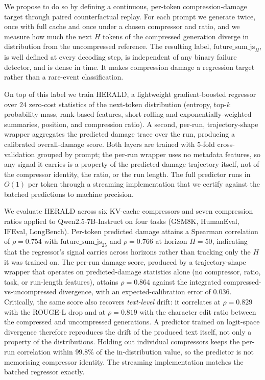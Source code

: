 \documentclass[11pt,a4paper]{article}
\begin{document}
We propose to do so by defining a continuous, per-token compression-damage target through paired counterfactual replay. For each prompt we generate twice, once with full cache and once under a chosen compressor and ratio, and we measure how much the next $H$ tokens of the compressed generation diverge in distribution from the uncompressed reference. The resulting label, $\text{future\_sum\_js}_H$, is well defined at every decoding step, is independent of any binary failure detector, and is dense in time. It makes compression damage a regression target rather than a rare-event classification.

On top of this label we train HERALD, a lightweight gradient-boosted regressor over $24$ zero-cost statistics of the next-token distribution (entropy, top-$k$ probability mass, rank-based features, short rolling and exponentially-weighted summaries, position, and compression ratio). A second, per-run, trajectory-shape wrapper aggregates the predicted damage trace over the run, producing a calibrated overall-damage score. Both layers are trained with $5$-fold cross-validation grouped by prompt; the per-run wrapper uses no metadata features, so any signal it carries is a property of the predicted-damage trajectory itself, not of the compressor identity, the ratio, or the run length. The full predictor runs in $O(1)$ per token through a streaming implementation that we certify against the batched predictions to machine precision.

We evaluate HERALD across six KV-cache compressors and seven compression ratios applied to Qwen$2.5$-$7$B-Instruct on four tasks (GSM8K, HumanEval, IFEval, LongBench). Per-token predicted damage attains a Spearman correlation of $\rho = 0.754$ with $\text{future\_sum\_js}_{25}$ and $\rho = 0.766$ at horizon $H=50$, indicating that the regressor's signal carries across horizons rather than tracking only the $H$ it was trained on. The per-run damage score, produced by a trajectory-shape wrapper that operates on predicted-damage statistics alone (no compressor, ratio, task, or run-length features), attains $\rho = 0.864$ against the integrated compressed-vs-uncompressed divergence, with an expected-calibration error of $0.036$. Critically, the same score also recovers \emph{text-level} drift: it correlates at $\rho = 0.829$ with the ROUGE-L drop and at $\rho = 0.819$ with the character edit ratio between the compressed and uncompressed generations. A predictor trained on logit-space divergence therefore reproduces the drift of the produced text itself, not only a property of the distributions. Holding out individual compressors keeps the per-run correlation within $99.8\%$ of the in-distribution value, so the predictor is not memorising compressor identity. The streaming implementation matches the batched regressor exactly.
\end{document}
